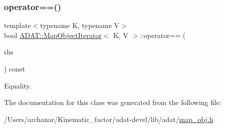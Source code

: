 \subsubsection{\texorpdfstring{operator==()}{operator==()}\hspace{0.1cm}{\footnotesize\ttfamily [3/3]}}
{\footnotesize\ttfamily template$<$typename K, typename V$>$ \\
bool \mbox{\hyperlink{classADAT_1_1MapObjectIterator}{A\+D\+A\+T\+::\+Map\+Object\+Iterator}}$<$ K, V $>$\+::operator== (\begin{DoxyParamCaption}\item[{const \mbox{\hyperlink{classADAT_1_1MapObjectIterator}{Map\+Object\+Iterator}}$<$ K, V $>$ \&}]{rhs }\end{DoxyParamCaption}) const\hspace{0.3cm}{\ttfamily [inline]}}



Equality. 



The documentation for this class was generated from the following file\+:\begin{DoxyCompactItemize}
\item 
/\+Users/archanar/\+Kinematic\+\_\+factor/adat-\/devel/lib/adat/\mbox{\hyperlink{adat-devel_2lib_2adat_2map__obj_8h}{map\+\_\+obj.\+h}}\end{DoxyCompactItemize}
